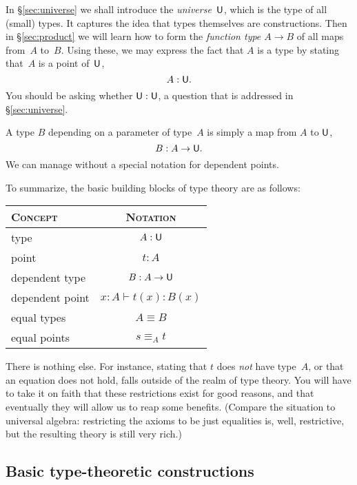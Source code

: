 \documentclass{amsart}
\begin{document}
In \S\ref{sec:universe} we shall introduce the \emph{universe~$\mathsf{U}$}, which is
the type of all (small) types. It captures the idea that types themselves are
constructions. Then in \S\ref{sec:product} we will learn how to form the
\emph{function type $A \to B$} of all maps from~$A$ to~$B$. Using these, we may
express the fact that $A$ is a type by stating that~$A$ is a point of~$\mathsf{U}$,
%
\begin{equation*}
  A : \mathsf{U}.
\end{equation*}
%
You should be asking whether $\mathsf{U} : \mathsf{U}$, a question that is addressed in \S\ref{sec:universe}.

A type $B$ depending on a parameter of type~$A$ is simply a map from $A$
to $\mathsf{U}$,
%
\begin{equation*}
  B : A \to \mathsf{U}.
\end{equation*}
%
We can manage without a special notation for dependent points.

To summarize, the basic building blocks of type theory are as follows:

\medskip
\begin{center}
\begin{tabular}{lc}
  \toprule
  \textsc{Concept} & \textsc{Notation} \\
  \midrule
  type             & $A : \mathsf{U}$ \\
  point            & $t : A$ \\
  dependent type   & $B : A \to \mathsf{U}$ \\
  dependent point  & $x : A \vdash t(x) : B(x)$ \\
  equal types      & $A \equiv B$ \\
  equal points     & $s \equiv_A t$ \\
  \bottomrule
\end{tabular}
\end{center}
\medskip

There is nothing else. For instance, stating that $t$ does \emph{not} have
type~$A$, or that an equation does not hold, falls outside of the realm of type
theory. You will have to take it on faith that these restrictions exist for good
reasons, and that eventually they will allow us to reap some benefits. (Compare
the situation to universal algebra: restricting the axioms to be just equalities
is, well, restrictive, but the resulting theory is still very rich.)


\subsection{Basic type-theoretic constructions}
\end{document}
